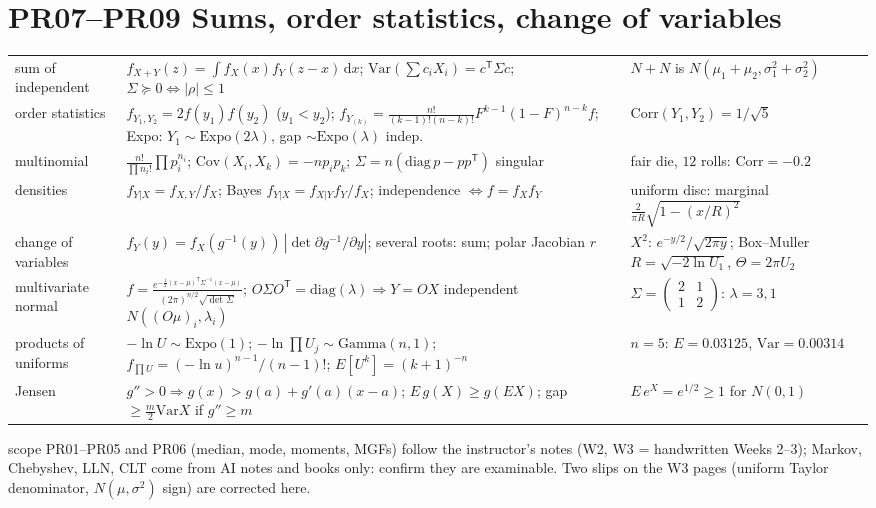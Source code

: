 \documentclass[9pt]{article}
\begin{document}
\section*{PR07--PR09 Sums, order statistics, change of variables}
\begin{tabular}{@{}p{2.9cm}p{8.4cm}p{6.1cm}@{}}
\toprule
sum of independent & $f_{X+Y}(z)=\int f_X(x)f_Y(z-x)\,\mathrm dx$; $\mathrm{Var}(\sum c_iX_i)=c^{\mathsf T}\Sigma c$; $\Sigma\succeq0\iff|\rho|\le1$ & $N+N$ is $N(\mu_1+\mu_2,\sigma_1^2+\sigma_2^2)$\\
order statistics & $f_{Y_1,Y_2}=2f(y_1)f(y_2)$ ($y_1<y_2$); $f_{Y_{(k)}}=\frac{n!}{(k-1)!(n-k)!}F^{k-1}(1-F)^{n-k}f$; Expo: $Y_1\sim\mathrm{Expo}(2\lambda)$, gap $\sim\mathrm{Expo}(\lambda)$ indep. & $\mathrm{Corr}(Y_1,Y_2)=1/\sqrt5$\\
multinomial & $\frac{n!}{\prod n_i!}\prod p_i^{n_i}$; $\mathrm{Cov}(X_i,X_k)=-np_ip_k$; $\Sigma=n(\mathrm{diag}\,p-pp^{\mathsf T})$ singular & fair die, $12$ rolls: $\mathrm{Corr}=-0.2$\\
densities & $f_{Y|X}=f_{X,Y}/f_X$; Bayes $f_{Y|X}=f_{X|Y}f_Y/f_X$; independence $\iff f=f_Xf_Y$ & uniform disc: marginal $\frac2{\pi R}\sqrt{1-(x/R)^2}$\\
change of variables & $f_Y(y)=f_X(g^{-1}(y))\,|\det\partial g^{-1}/\partial y|$; several roots: sum; polar Jacobian $r$ & $X^2$: $e^{-y/2}/\sqrt{2\pi y}$; Box--Muller $R=\sqrt{-2\ln U_1}$, $\Theta=2\pi U_2$\\
multivariate normal & $f=\frac{e^{-\frac12(x-\mu)^{\mathsf T}\Sigma^{-1}(x-\mu)}}{(2\pi)^{n/2}\sqrt{\det\Sigma}}$; $O\Sigma O^{\mathsf T}=\mathrm{diag}(\lambda)\Rightarrow Y=OX$ independent $N((O\mu)_i,\lambda_i)$ & $\Sigma=\begin{pmatrix}2&1\\1&2\end{pmatrix}$: $\lambda=3,1$\\
products of uniforms & $-\ln U\sim\mathrm{Expo}(1)$; $-\ln\prod U_j\sim\mathrm{Gamma}(n,1)$; $f_{\prod U}=(-\ln u)^{n-1}/(n-1)!$; $E[U^k]=(k+1)^{-n}$ & $n=5$: $E=0.03125$, $\mathrm{Var}=0.00314$\\
Jensen & $g''>0\Rightarrow g(x)>g(a)+g'(a)(x-a)$; $E\,g(X)\ge g(EX)$; gap $\ge\frac m2\mathrm{Var}X$ if $g''\ge m$ & $E\,e^X=e^{1/2}\ge1$ for $N(0,1)$\\
\bottomrule
\end{tabular}

\vspace{3pt}
\begin{verifybox}{scope}
PR01--PR05 and PR06 (median, mode, moments, MGFs) follow the instructor's notes (W2, W3 = handwritten Weeks 2--3); Markov, Chebyshev, LLN, CLT come from AI notes and books only: confirm they are examinable. Two slips on the W3 pages (uniform Taylor denominator, $N(\mu,\sigma^2)$ sign) are corrected here.
\end{verifybox}
\end{document}
